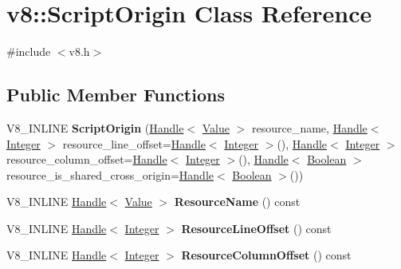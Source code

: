 \hypertarget{classv8_1_1_script_origin}{}\section{v8\+:\+:Script\+Origin Class Reference}
\label{classv8_1_1_script_origin}


{\ttfamily \#include $<$v8.\+h$>$}

\subsection*{Public Member Functions}
\begin{DoxyCompactItemize}
\item 
\hypertarget{classv8_1_1_script_origin_a59a6e8e17f7206e907d2c46c7c962eab}{}V8\+\_\+\+I\+N\+L\+I\+N\+E {\bfseries Script\+Origin} (\hyperlink{classv8_1_1_handle}{Handle}$<$ \hyperlink{classv8_1_1_value}{Value} $>$ resource\+\_\+name, \hyperlink{classv8_1_1_handle}{Handle}$<$ \hyperlink{classv8_1_1_integer}{Integer} $>$ resource\+\_\+line\+\_\+offset=\hyperlink{classv8_1_1_handle}{Handle}$<$ \hyperlink{classv8_1_1_integer}{Integer} $>$(), \hyperlink{classv8_1_1_handle}{Handle}$<$ \hyperlink{classv8_1_1_integer}{Integer} $>$ resource\+\_\+column\+\_\+offset=\hyperlink{classv8_1_1_handle}{Handle}$<$ \hyperlink{classv8_1_1_integer}{Integer} $>$(), \hyperlink{classv8_1_1_handle}{Handle}$<$ \hyperlink{classv8_1_1_boolean}{Boolean} $>$ resource\+\_\+is\+\_\+shared\+\_\+cross\+\_\+origin=\hyperlink{classv8_1_1_handle}{Handle}$<$ \hyperlink{classv8_1_1_boolean}{Boolean} $>$())\label{classv8_1_1_script_origin_a59a6e8e17f7206e907d2c46c7c962eab}

\item 
\hypertarget{classv8_1_1_script_origin_a289502d71720ca10e53b4a32d9226f58}{}V8\+\_\+\+I\+N\+L\+I\+N\+E \hyperlink{classv8_1_1_handle}{Handle}$<$ \hyperlink{classv8_1_1_value}{Value} $>$ {\bfseries Resource\+Name} () const \label{classv8_1_1_script_origin_a289502d71720ca10e53b4a32d9226f58}

\item 
\hypertarget{classv8_1_1_script_origin_a0735178b8afef9169a3481cf6cd7c557}{}V8\+\_\+\+I\+N\+L\+I\+N\+E \hyperlink{classv8_1_1_handle}{Handle}$<$ \hyperlink{classv8_1_1_integer}{Integer} $>$ {\bfseries Resource\+Line\+Offset} () const \label{classv8_1_1_script_origin_a0735178b8afef9169a3481cf6cd7c557}

\item 
\hypertarget{classv8_1_1_script_origin_a6d1b4cb1be2b6589151a029974cd1a60}{}V8\+\_\+\+I\+N\+L\+I\+N\+E \hyperlink{classv8_1_1_handle}{Handle}$<$ \hyperlink{classv8_1_1_integer}{Integer} $>$ {\bfseries Resource\+Column\+Offset} () const \label{classv8_1_1_script_origin_a6d1b4cb1be2b6589151a029974cd1a60}


\end{DoxyCompactItemize}
